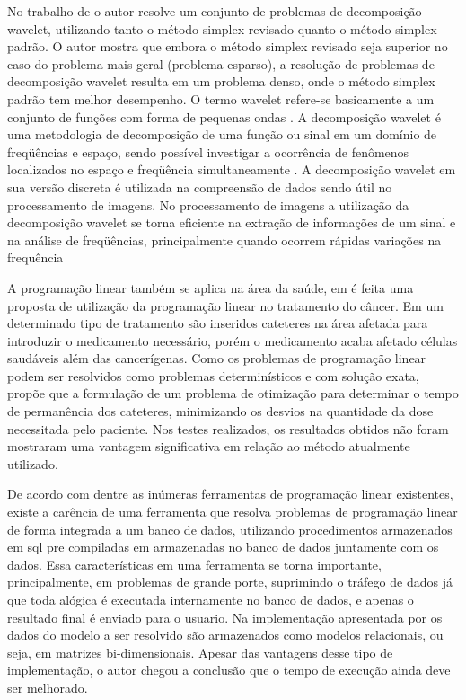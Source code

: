 No trabalho de  o autor resolve um conjunto de problemas de decomposição wavelet, utilizando tanto o método simplex revisado quanto o método simplex padrão. O autor mostra que embora o método simplex revisado seja superior no caso do problema mais geral (problema esparso), a resolução de problemas de decomposição wavelet resulta em um problema denso, onde o método simplex padrão tem melhor  desempenho.
O termo wavelet refere-se basicamente a um conjunto de funções com forma de pequenas ondas \cite{Ondaletas}. A decomposição wavelet é uma metodologia de decomposição de uma função ou sinal em um domínio de freqüências e espaço, sendo possível investigar a ocorrência de fenômenos localizados no espaço e freqüência simultaneamente \cite{Peixoto-wavelet}.
A decomposição wavelet em sua versão discreta é utilizada na compreensão de dados sendo útil no processamento de imagens. No processamento de imagens a utilização da decomposição wavelet se torna eficiente na extração de informações de um sinal e na análise de freqüências, principalmente quando ocorrem rápidas variações na frequência \cite{Leite-wavelet}

A programação linear também se aplica na área da saúde, em  é feita uma proposta de utilização da programação linear no tratamento do câncer.
Em um determinado tipo de tratamento são inseridos cateteres na área afetada para introduzir o medicamento necessário, porém o medicamento acaba afetado células saudáveis além das cancerígenas. Como os problemas de programação linear podem ser resolvidos como problemas determinísticos e com solução exata,  propõe que a formulação de um problema de otimização para determinar o tempo de permanência dos cateteres, minimizando os desvios na quantidade da dose necessitada pelo paciente. Nos testes realizados, os resultados obtidos não foram mostraram uma vantagem significativa em relação ao método atualmente utilizado.

De acordo com  dentre as inúmeras ferramentas de programação linear existentes, existe a carência de uma ferramenta que resolva problemas de programação linear de forma integrada a um banco de dados, utilizando procedimentos armazenados em sql pre compiladas em armazenadas no banco de dados juntamente com os dados. Essa características em uma ferramenta se torna importante, principalmente, em problemas de grande porte, suprimindo o tráfego de dados já que toda alógica é executada internamente no banco de dados, e apenas o resultado final é enviado para o usuario. Na implementação apresentada por  os dados do modelo a ser resolvido são armazenados como modelos relacionais, ou seja, em matrizes bi-dimensionais. Apesar das vantagens desse tipo de implementação, o autor chegou a conclusão que o tempo de execução ainda deve ser melhorado.

